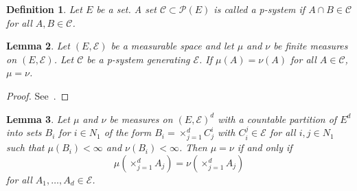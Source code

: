 \documentclass[english,twoside,openright]{HYgraduMLDS}
\newtheorem{lemma}{Lemma}[chapter]
\newtheorem{definition}[lemma]{Definition}
\DeclareMathOperator*{\bigtimes}{\times}
\begin{document}
\begin{definition}
	Let \(E\) be a set. A set \(\mathcal{C}\subset \mathcal{P}(E)\) is
  called a p-system if \(A\cap B\in \mathcal{C}\) for all
  \(A, B\in \mathcal{C}\).
\end{definition}
\begin{lemma}\label{p_system_measure_equality_lemma}
	Let \((E, \mathcal{E})\) be a measurable space and let
  \(\mu\) and \(\nu\) be finite measures on \((E, \mathcal{E})\).
  Let \(\mathcal{C}\) be a p-system generating \(\mathcal{E}\).
  If \(\mu(A) = \nu(A)\) for all \(A\in \mathcal{C}\), \(\mu = \nu\).
\end{lemma}
\begin{proof}
	See~\cite[Proposition 3.7]{Cin11}.
\end{proof}
\begin{lemma}\label{product_measurable_space_equality_lemma}
	Let \(\mu\) and \(\nu\) be measures on \((E, \mathcal{E})^{d}\) with
  a countable partition of \(E^{d}\) into sets \(B_{i}\) for \(i\in N_{1}\)
  of the form
  \(B_{i} = \bigtimes_{j=1}^{d}C_{j}^{i}\) with
  \(C_{i}^{j}\in \mathcal{E}\) for all \(i, j\in N_{1}\) such that
  \(\mu(B_{i}) < \infty\) and \(\nu(B_{i}) < \infty\). Then \(\mu = \nu\)
  if and only if
  \[
    \mu\left(\bigtimes_{j=1}^{d}A_{j}\right)
    = \nu\left(\bigtimes_{j=1}^{d}A_{j}\right)
  \]
  for all \(A_{1},\dotsc, A_{d} \in \mathcal{E}\).
\end{lemma}
\end{document}
